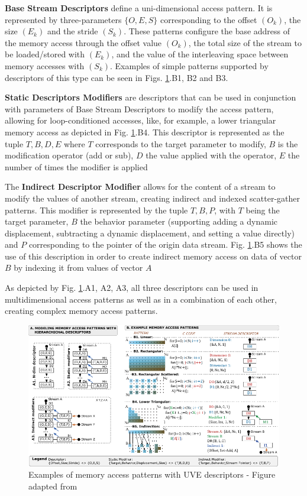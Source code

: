 \textbf{Base Stream Descriptors} define a uni-dimensional access pattern. It is represented by three-parameters $\{O, E, S\}$ corresponding to the offset $(O_k)$, the size $(E_k)$ and the stride $(S_k)$. These patterns configure the base address of the memory access through the offset value $(O_k)$, the total size of the stream to be loaded/stored with $(E_k)$, and the value of the interleaving space between memory accesses with $(S_k)$. Examples of simple patterns supported by descriptors of this type can be seen in Figs. \ref{fig:stream-descriptors}.B1, B2 and B3.

\textbf{Static Descriptors Modifiers} are descriptors that can be used in conjunction with parameters of Base Stream Descriptors to modify the access pattern, allowing for loop-conditioned accesses, like, for example, a lower triangular memory access as depicted in Fig. \ref{fig:stream-descriptors}.B4. This descriptor is represented as the tuple ${T, B, D, E}$ where $T$ corresponds to the target parameter to modify, $B$ is the modification operator (add or sub), $D$ the value applied with the operator, $E$ the number of times the modifier is applied 

The \textbf{Indirect Descriptor Modifier} allows for the content of a stream to modify the values of another stream, creating indirect and indexed scatter-gather patterns. This modifier is represented by the tuple ${T, B, P}$, with $T$ being the target parameter, $B$ the behavior parameter (supporting adding a dynamic displacement, subtracting a dynamic displacement, and setting a value directly) and $P$ corresponding to the pointer of the origin data stream. Fig. \ref{fig:stream-descriptors}.B5 shows the use of this description in order to create indirect memory access on data of vector $B$ by indexing it from values of vector $A$

As depicted by Fig. \ref{fig:stream-descriptors}.A1, A2, A3, all three descriptors can be used in multidimensional access patterns as well as in a combination of each other, creating complex memory access patterns.

\begin{figure}[H]
	\begin{center}
 		\includegraphics[width=.87\linewidth]{images/UVE-Descriptors.pdf}
 		\caption{Examples of memory access patterns with UVE descriptors - Figure adapted from \cite{uve-paper}}
 		\label{fig:stream-descriptors}
	\end{center} 
\end{figure}



